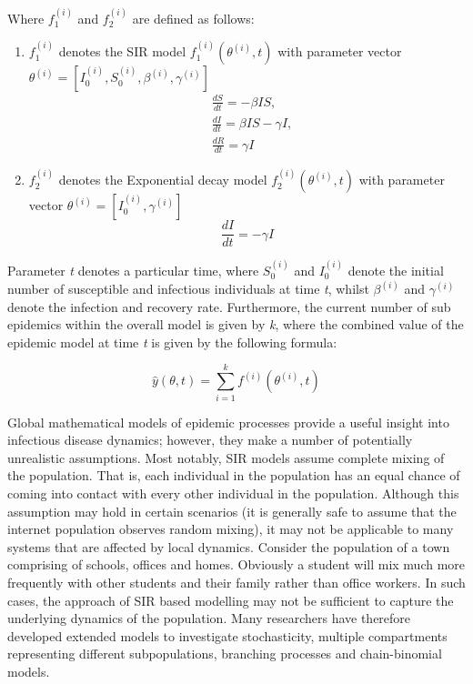 \documentclass[11pt, a4paper, oneside,titlepage]{article}
\begin{document}
\begin{framed}
Where $f_1^{(i)}$ and $f_2^{(i)}$ are defined as follows:
\begin{enumerate}[label=\Alph{*}.]
	\item $f_1^{(i)}$ denotes the SIR model $f_1^{(i)}(\theta^{(i)}, t)$ with parameter vector $\theta^{(i)} = [I_0^{(i)}, S_0^{(i)}, \beta^{(i)}, \gamma^{(i)}]$
\begin{equation*}
	\begin{split}
	&\frac{dS}{dt} = -\beta IS, \\
	&\frac{dI}{dt} = \beta IS - \gamma I, \\
	&\frac{dR}{dt} = \gamma I
	\end{split}
\end{equation*}
	\item $f_2^{(i)}$ denotes the Exponential decay model $f_2^{(i)}(\theta^{(i)}, t)$ with parameter vector $\theta^{(i)} = [I_0^{(i)}, \gamma^{(i)}]$
\begin{equation*}
	\frac{dI}{dt} = - \gamma I
\end{equation*}
\end{enumerate}
	
Parameter \emph{t} denotes a particular time, where $S_0^{(i)}$ and
$I_0^{(i)}$ denote the initial number of susceptible and infectious
individuals at time \emph{t}, whilst $\beta^{(i)}$ and
$\gamma^{(i)}$denote the infection and recovery rate. Furthermore, the
current number of sub epidemics within the overall model is given by
\emph{k}, where the combined value of the epidemic model at time
\emph{t} is given by the following formula:

\begin{equation*}
	\hat{y}(\theta ,t) = \sum\limits_{i=1}^k f^{(i)}(\theta^{(i)} ,t)
\end{equation*}
\end{framed}

Global mathematical models of epidemic processes provide a useful
insight into infectious disease dynamics; however, they make a number
of potentially unrealistic assumptions. Most notably, SIR models
assume complete mixing of the population. That is, each individual in
the population has an equal chance of coming into contact with every
other individual in the population. Although this assumption may hold
in certain scenarios (it is generally safe to assume that the internet
population observes random mixing), it may not be applicable to many
systems that are affected by local dynamics. Consider the population
of a town comprising of schools, offices and homes. Obviously a
student will mix much more frequently with other students and their
family rather than office workers. In such cases, the approach of SIR
based modelling may not be sufficient to capture the underlying
dynamics of the population. Many researchers have therefore developed
extended models to investigate stochasticity, multiple compartments
representing different subpopulations, branching processes and
chain-binomial models.\cite{computational}
\end{document}
